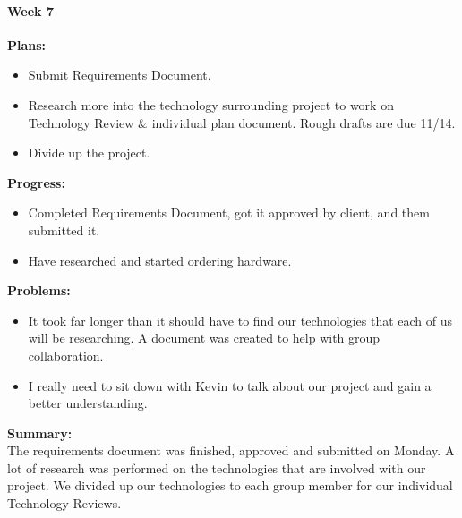 \paragraph{Week 7}
\begin{adjustwidth}{2.5em}{0pt}
    \vspace{-0.5cm}\textbf{Plans:}
    \vspace{-0.5cm}
    \begin{itemize}
        \item Submit Requirements Document.
		\item Research more into the technology surrounding project to work on Technology Review \& individual plan document. Rough drafts are due 11/14.
		\item Divide up the project.
    \end{itemize} 
    \vspace{-0.3cm}\textbf{Progress:}
    \vspace{-0.5cm}
    \begin{itemize}
        \item Completed Requirements Document, got it approved by client, and them submitted it.
		\item Have researched and started ordering hardware.
    \end{itemize} 
    \vspace{-0.3cm}\textbf{Problems:}
    \vspace{-0.5cm}
    \begin{itemize}
        \item It took far longer than it should have to find our technologies that each of us will be researching. A document was created to help with group collaboration. 
		\item I really need to sit down with Kevin to talk about our project and gain a better understanding. 
    \end{itemize}  
    \vspace{-0.3cm}\noindent\textbf{Summary:}\\
    \noindent The requirements document was finished, approved and submitted on Monday. A lot of research was performed on the technologies that are involved with our project. We divided up our technologies to each group member for our individual Technology Reviews. 
\end{adjustwidth} 


